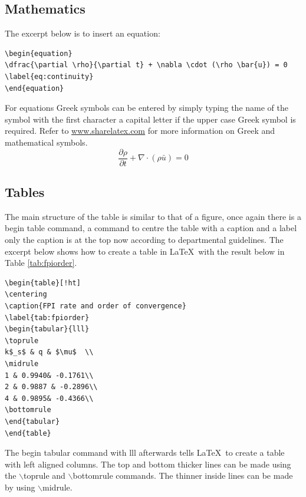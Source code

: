 \documentclass[a4paper,12pt]{article}
\begin{document}
\subsection{Mathematics}
The excerpt below is to insert an equation:
\begin{lstlisting}
\begin{equation}
\dfrac{\partial \rho}{\partial t} + \nabla \cdot (\rho \bar{u}) = 0
\label{eq:continuity}
\end{equation}
\end{lstlisting}
For equations Greek symbols can be entered by simply typing the name of the symbol with the first character a capital letter if the upper case Greek symbol is required. Refer to \href{https://www.sharelatex.com/learn/List_of_Greek_letters_and_math_symbols}{www.sharelatex.com} for more information on Greek and mathematical symbols.
\begin{equation}
\label{eq:continuity}
\frac{\partial \rho}{\partial t} + \nabla \cdot (\rho \bar{u}) = 0
\end{equation}

\subsection{Tables}
The main structure of the table is similar to that of a figure, once again there is a begin table command, a command to centre the table with a caption and a label only the caption is at the top now according to departmental guidelines. The excerpt below shows how to create a table in \LaTeX\ with the result below in Table \ref{tab:fpiorder}.
\begin{lstlisting}
\begin{table}[!ht]
\centering
\caption{FPI rate and order of convergence}
\label{tab:fpiorder}
\begin{tabular}{lll}
\toprule
k$_s$ & q & $\mu$  \\
\midrule
1 & 0.9940& -0.1761\\
2 & 0.9887 & -0.2896\\
4 & 0.9895& -0.4366\\
\bottomrule
\end{tabular}
\end{table}
\end{lstlisting}
The begin tabular command with {lll} afterwards tells \LaTeX\ to create a table with left aligned columns. The top and bottom thicker lines can be made using the $\backslash$toprule and $\backslash$bottomrule commands. The thinner inside lines can be made by using $\backslash$midrule.
\end{document}
